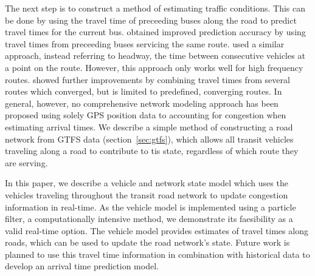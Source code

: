 The next step is to construct a method of estimating traffic conditions.
This can be done by using the travel time of preceeding buses along the road
to predict travel times for the current bus.
\cite{Yu_2010} obtained improved prediction accuracy by using travel times
from preceeding buses servicing the same route.
\cite{Hans_2015} used a similar approach,
instead referring to headway, the time between consecutive vehicles
at a point on the route.
However, this approach only works well for high frequency routes.
\cite{Yu_2011} showed further improvements by combining travel times 
from several routes which converged,
but is limited to predefined, converging routes.
In general, however, no comprehensive network modeling approach has been proposed using
solely GPS position data to accounting for congestion when estimating arrival times.
We describe a simple method of constructing a road network
from GTFS data (section~\ref{sec:gtfs}),
which allows all transit vehicles traveling along a road to contribute to tis state,
regardless of which route they are serving.

In this paper, we describe a \rt vehicle and network state
model which uses the vehicles traveling throughout the transit road network
to update congestion information in real-time.
As the vehicle model is implemented using a particle filter,
a computationally intensive method,
we demonstrate its faesibility as a valid real-time option.
The vehicle model provides estimates of travel times along roads,
which can be used to update the road network's state.
Future work is planned to use this travel time information 
in combination with historical data to develop an arrival time prediction model.




